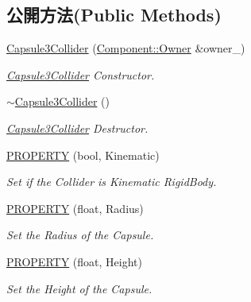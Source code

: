 \subsection*{公開方法(Public Methods)}
\begin{DoxyCompactItemize}
\item 
\hyperlink{class_i_dream_sky_1_1_capsule3_collider_a587731f0c8651797ed4b1197247c5639}{Capsule3\+Collider} (\hyperlink{class_i_dream_sky_1_1_component_1_1_owner}{Component\+::\+Owner} \&owner\+\_\+)
\begin{DoxyCompactList}\small\item\em \hyperlink{class_i_dream_sky_1_1_capsule3_collider}{Capsule3\+Collider} Constructor. \end{DoxyCompactList}\item 
\hyperlink{class_i_dream_sky_1_1_capsule3_collider_ae058105f27b8c2d3c3d0bf71fa583982}{$\sim$\+Capsule3\+Collider} ()
\begin{DoxyCompactList}\small\item\em \hyperlink{class_i_dream_sky_1_1_capsule3_collider}{Capsule3\+Collider} Destructor. \end{DoxyCompactList}\item 
\hyperlink{class_i_dream_sky_1_1_capsule3_collider_ad0fd59097a2982d411d43e693f36ac11}{P\+R\+O\+P\+E\+R\+TY} (bool, Kinematic)
\begin{DoxyCompactList}\small\item\em Set if the Collider is Kinematic Rigid\+Body. \end{DoxyCompactList}\item 
\hyperlink{class_i_dream_sky_1_1_capsule3_collider_a25a9e38dd41bfb7119713aac158732dd}{P\+R\+O\+P\+E\+R\+TY} (float, Radius)
\begin{DoxyCompactList}\small\item\em Set the Radius of the Capsule. \end{DoxyCompactList}\item 
\hyperlink{class_i_dream_sky_1_1_capsule3_collider_a843ef83d4a10a10dbaeea18b63c85f68}{P\+R\+O\+P\+E\+R\+TY} (float, Height)
\begin{DoxyCompactList}\small\item\em Set the Height of the Capsule. \end{DoxyCompactList}\end{DoxyCompactItemize}
